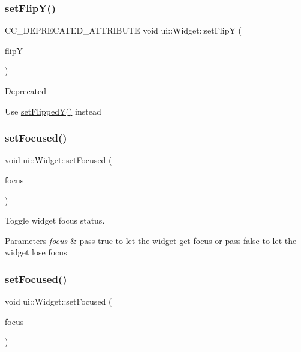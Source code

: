 \subsubsection{\texorpdfstring{set\+Flip\+Y()}{setFlipY()}\hspace{0.1cm}{\footnotesize\ttfamily [2/2]}}
{\footnotesize\ttfamily C\+C\+\_\+\+D\+E\+P\+R\+E\+C\+A\+T\+E\+D\+\_\+\+A\+T\+T\+R\+I\+B\+U\+TE void ui\+::\+Widget\+::set\+FlipY (\begin{DoxyParamCaption}\item[{bool}]{flipY }\end{DoxyParamCaption})\hspace{0.3cm}{\ttfamily [inline]}}

\begin{DoxyRefDesc}{Deprecated}
\item[\hyperlink{deprecated__deprecated000410}{Deprecated}]Use \hyperlink{classui_1_1Widget_add1302904325f3784a02d29e29f83c94}{set\+Flipped\+Y()} instead \end{DoxyRefDesc}
\mbox{\label{classui_1_1Widget_a8f201a8a4676a135d4e77d2be62cac2b}} 
\subsubsection{\texorpdfstring{set\+Focused()}{setFocused()}\hspace{0.1cm}{\footnotesize\ttfamily [1/2]}}
{\footnotesize\ttfamily void ui\+::\+Widget\+::set\+Focused (\begin{DoxyParamCaption}\item[{bool}]{focus }\end{DoxyParamCaption})}

Toggle widget focus status. 
\begin{DoxyParams}{Parameters}
{\em focus} & pass true to let the widget get focus or pass false to let the widget lose focus \\
\hline
\end{DoxyParams}
\mbox{\label{classui_1_1Widget_a8f201a8a4676a135d4e77d2be62cac2b}} 
\subsubsection{\texorpdfstring{set\+Focused()}{setFocused()}\hspace{0.1cm}{\footnotesize\ttfamily [2/2]}}
{\footnotesize\ttfamily void ui\+::\+Widget\+::set\+Focused (\begin{DoxyParamCaption}\item[{bool}]{focus }\end{DoxyParamCaption})}

